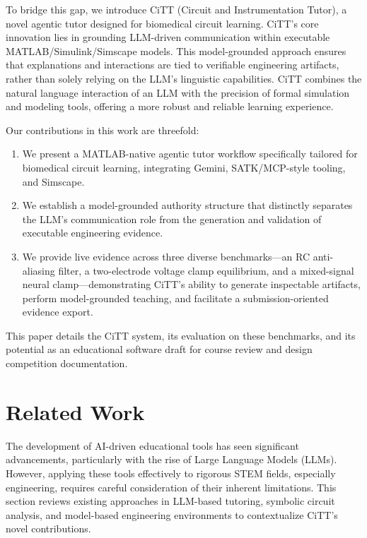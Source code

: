 \documentclass[10pt,twocolumn,letterpaper]{article}
\begin{document}
To bridge this gap, we introduce CiTT (Circuit and Instrumentation Tutor), a novel agentic tutor designed for biomedical circuit learning. CiTT's core innovation lies in grounding LLM-driven communication within executable MATLAB/Simulink/Simscape models. This model-grounded approach ensures that explanations and interactions are tied to verifiable engineering artifacts, rather than solely relying on the LLM's linguistic capabilities. CiTT combines the natural language interaction of an LLM with the precision of formal simulation and modeling tools, offering a more robust and reliable learning experience.

Our contributions in this work are threefold:
\begin{enumerate}
    \item We present a MATLAB-native agentic tutor workflow specifically tailored for biomedical circuit learning, integrating Gemini, SATK/MCP-style tooling, and Simscape.
    \item We establish a model-grounded authority structure that distinctly separates the LLM's communication role from the generation and validation of executable engineering evidence.
    \item We provide live evidence across three diverse benchmarks—an RC anti-aliasing filter, a two-electrode voltage clamp equilibrium, and a mixed-signal neural clamp—demonstrating CiTT's ability to generate inspectable artifacts, perform model-grounded teaching, and facilitate a submission-oriented evidence export.
\end{enumerate}
This paper details the CiTT system, its evaluation on these benchmarks, and its potential as an educational software draft for course review and design competition documentation.

\section{Related Work}
\label{sec:related_work}
The development of AI-driven educational tools has seen significant advancements, particularly with the rise of Large Language Models (LLMs). However, applying these tools effectively to rigorous STEM fields, especially engineering, requires careful consideration of their inherent limitations. This section reviews existing approaches in LLM-based tutoring, symbolic circuit analysis, and model-based engineering environments to contextualize CiTT's novel contributions.
\end{document}
